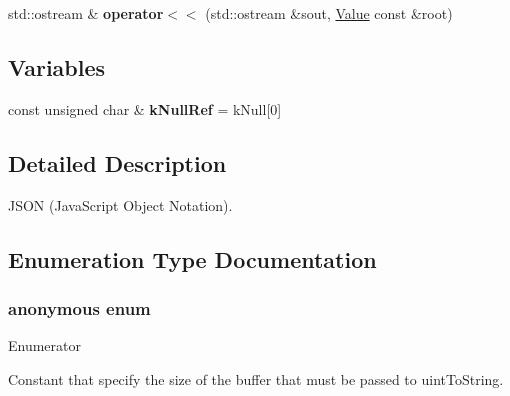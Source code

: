 \begin{DoxyCompactItemize}
\item 
\hypertarget{namespace_json_af64fba09a9679b8b8cb50dd3e85f6fd5}{}std\+::ostream \& {\bfseries operator$<$$<$} (std\+::ostream \&sout, \hyperlink{class_json_1_1_value}{Value} const \&root)\label{namespace_json_af64fba09a9679b8b8cb50dd3e85f6fd5}

\end{DoxyCompactItemize}
\subsection*{Variables}
\begin{DoxyCompactItemize}
\item 
\hypertarget{namespace_json_ab30055b4bbd82aecaca57ccecd63bbe6}{}const unsigned char \& {\bfseries k\+Null\+Ref} = k\+Null\mbox{[}0\mbox{]}\label{namespace_json_ab30055b4bbd82aecaca57ccecd63bbe6}

\end{DoxyCompactItemize}


\subsection{Detailed Description}
J\+S\+O\+N (Java\+Script Object Notation). 

\subsection{Enumeration Type Documentation}
\hypertarget{namespace_json_a2aacab54ef6fc18e833fbd4982a0a23a}{}\subsubsection[{anonymous enum}]{\setlength{\rightskip}{0pt plus 5cm}anonymous enum}\label{namespace_json_a2aacab54ef6fc18e833fbd4982a0a23a}
\begin{Desc}
\item[Enumerator]\par
\begin{description}
\item[{\em 
\hypertarget{namespace_json_a2aacab54ef6fc18e833fbd4982a0a23aae4f2008c7919f20d81286121d1374424}{}uint\+To\+String\+Buffer\+Size\label{namespace_json_a2aacab54ef6fc18e833fbd4982a0a23aae4f2008c7919f20d81286121d1374424}
}]Constant that specify the size of the buffer that must be passed to uint\+To\+String. \end{description}
\end{Desc}
\hypertarget{namespace_json_a4fc417c23905b2ae9e2c47d197a45351}{}
